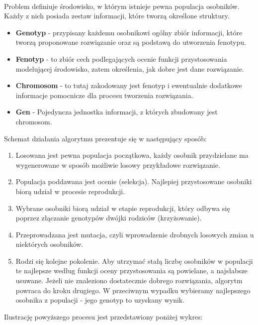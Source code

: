 \paragraph{}Problem definiuje środowisko, w którym istnieje pewna populacja osobników. Każdy z nich posiada zestaw informacji, które tworzą określone struktury.
\begin {itemize}
\item \textbf{Genotyp} - przypisany każdemu osobnikowi ogólny zbiór informacji, które tworzą proponowane rozwiązanie oraz są podstawą do utworzenia fenotypu.
\item \textbf{Fenotyp} - to zbiór cech podlegających ocenie funkcji przystosowania modelującej środowisko, zatem określenia, jak dobre jest dane rozwiązanie.
\item \textbf{Chromosom} - to tutaj zakodowany jest fenotyp i ewentualnie dodatkowe informacje pomocnicze dla procesu tworzenia rozwiązania.
\item \textbf{Gen} - Pojedyncza jednostka informacji, z których zbudowany jest chromosom.
\end{itemize}
\par Schemat działania algorytmu prezentuje się w następujący sposób:
\begin{enumerate}
\item Losowana jest pewna populacja początkowa, każdy osobnik przydzielane ma wygenerowane w sposób możliwie losowy przykładowe rozwiązanie.
\item Populacja poddawana jest ocenie (selekcja). Najlepiej przystosowane osobniki biorą udział w procesie reprodukcji.
\item Wybrane osobniki biorą udział w etapie reprodukcji, który odbywa się poprzez  złączanie genotypów dwójki rodziców (krzyżowanie).
\item Przeprowadzana jest mutacja, czyli wprowadzenie drobnych losowych zmian u niektórych osobników.
\item Rodzi się kolejne pokolenie. Aby utrzymać stałą liczbę osobników w populacji te najlepsze według funkcji oceny przystosowania są powielane, a najsłabsze usuwane. Jeżeli nie znaleziono dostatecznie dobrego rozwiązania, algorytm powraca do kroku drugiego. W przeciwnym wypadku wybieramy najlepszego osobnika z populacji - jego genotyp to uzyskany wynik.
\end{enumerate}
\par Ilustrację powyższego procesu jest przedstawiony poniżej wykres:
